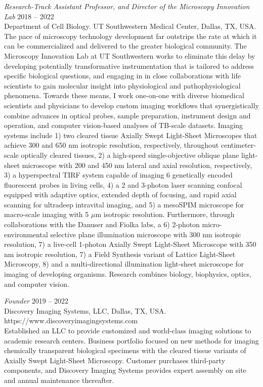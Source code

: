 \documentclass[10pt]{res}
\newcommand{\forceindent}{\leavevmode{\parindent=2em\indent}}
\begin{document}
\begin{resume}
{\sl Research-Track Assistant Professor, and Director of the Microscopy Innovation Lab} \hfill 2018 -- 2022 \\ 
Department of Cell Biology. \newline UT Southwestern Medical Center, Dallas, TX, USA. \hfill \\
\forceindent The pace of microscopy technology development far outstrips the rate at which it can be commercialized and delivered to the greater biological community.  The Microscopy Innovation Lab at UT Southwestern works to eliminate this delay by developing potentially transformative instrumentation that is tailored to address specific biological questions, and engaging in in close collaborations with life scientists to gain molecular insight into physiological and pathophysiological phenomena. Towards these means, I work one-on-one with diverse biomedical scientists and physicians to develop custom imaging workflows that synergistically combine advances in optical probes, sample preparation, instrument design and operation, and computer vision-based analyses of TB-scale datasets. Imaging systems include 1) two cleared tissue Axially Swept Light-Sheet Microscopes that achieve 300 and 650 nm isotropic resolution, respectively, throughout centimeter-scale optically cleared tissues, 2) a high-speed single-objective oblique plane light-sheet microscope with 200 and 450 nm lateral and axial resolution, respectively, 3) a hyperspectral TIRF system capable of imaging 6 genetically encoded fluorescent probes in living cells, 4) a 2 and 3-photon laser scanning confocal equipped with adaptive optics, extended depth of focusing, and rapid axial scanning for ultradeep intravital imaging, and 5) a mesoSPIM microscope for macro-scale imaging with 5 $\mu$m isotropic resolution. Furthermore, through collaborations with the Danuser and Fiolka labs, a 6) 2-photon micro-environmental selective plane illumination microscope with 300 nm isotropic resolution, 7) a live-cell 1-photon Axially Swept Light-Sheet Microscope with 350 nm isotropic resolution, 7) a Field Synthesis variant of Lattice Light-Sheet Microscopy, 8) and a multi-directional illumination light-sheet microscope for imaging of developing organisms. Research combines biology, biophysics, optics, and computer vision.  
\newline

{\sl Founder} \hfill 2019 -- 2022 \\ 
Discovery Imaging Systems, LLC, Dallas, TX, USA. \hfill \\
https://www.discoveryimagingsystems.com \\
\forceindent Established an LLC to provide customized and world-class imaging solutions to academic research centers.  Business portfolio focused on new methods for imaging chemically transparent biological specimens with the cleared tissue variants of Axially Swept Light-Sheet Microscopy.  Customer purchases third-party components, and Discovery Imaging Systems provides expert assembly on site and annual maintenance thereafter.


\end{resume}
\end{document}

